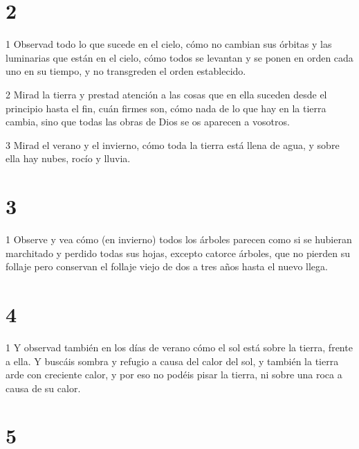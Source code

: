 \chapter{2}

\par 1 Observad todo lo que sucede en el cielo, cómo no cambian sus órbitas y las luminarias que están en el cielo, cómo todos se levantan y se ponen en orden cada uno en su tiempo, y no transgreden el orden establecido.
\par 2 Mirad la tierra y prestad atención a las cosas que en ella suceden desde el principio hasta el fin, cuán firmes son, cómo nada de lo que hay en la tierra cambia, sino que todas las obras de Dios se os aparecen a vosotros.
\par 3 Mirad el verano y el invierno, cómo toda la tierra está llena de agua, y sobre ella hay nubes, rocío y lluvia.

\chapter{3}

\par 1 Observe y vea cómo (en invierno) todos los árboles parecen como si se hubieran marchitado y perdido todas sus hojas, excepto catorce árboles, que no pierden su follaje pero conservan el follaje viejo de dos a tres años hasta el nuevo llega.

\chapter{4}

\par 1 Y observad también en los días de verano cómo el sol está sobre la tierra, frente a ella. Y buscáis sombra y refugio a causa del calor del sol, y también la tierra arde con creciente calor, y por eso no podéis pisar la tierra, ni sobre una roca a causa de su calor.

\chapter{5}

